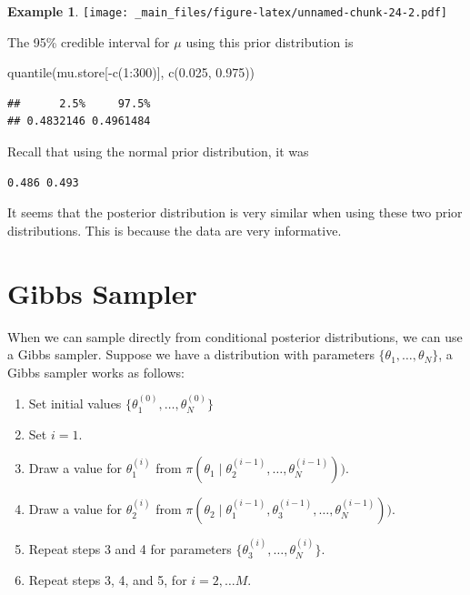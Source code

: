 \documentclass[
]{book}
\newenvironment{Shaded}{\begin{snugshade}}{\end{snugshade}}
\newcommand{\DecValTok}[1]{\textcolor[rgb]{0.00,0.00,0.81}{#1}}
\newcommand{\FloatTok}[1]{\textcolor[rgb]{0.00,0.00,0.81}{#1}}
\newcommand{\FunctionTok}[1]{\textcolor[rgb]{0.00,0.00,0.00}{#1}}
\newcommand{\NormalTok}[1]{#1}
\newcommand{\SpecialCharTok}[1]{\textcolor[rgb]{0.00,0.00,0.00}{#1}}
\theoremstyle{definition}
\theoremstyle{definition}
\newtheorem{example}{Example}[chapter]
\theoremstyle{definition}
\theoremstyle{definition}
\theoremstyle{remark}
\begin{document}
\begin{example}
\texttt{[image: \_main\_files/figure-latex/unnamed-chunk-24-2.pdf]}

The 95\% credible interval for \(\mu\) using this prior distribution is

\begin{Shaded}
\begin{Highlighting}[]
\FunctionTok{quantile}\NormalTok{(mu.store[}\SpecialCharTok{{-}}\FunctionTok{c}\NormalTok{(}\DecValTok{1}\SpecialCharTok{:}\DecValTok{300}\NormalTok{)], }\FunctionTok{c}\NormalTok{(}\FloatTok{0.025}\NormalTok{, }\FloatTok{0.975}\NormalTok{))}
\end{Highlighting}
\end{Shaded}

\begin{verbatim}
##      2.5%     97.5% 
## 0.4832146 0.4961484
\end{verbatim}

Recall that using the normal prior distribution, it was

\begin{verbatim}
0.486 0.493
\end{verbatim}

It seems that the posterior distribution is very similar when using these two prior distributions. This is because the data are very informative.
\end{example}

\hypertarget{gibbs-sampler}{%
\section{Gibbs Sampler}\label{gibbs-sampler}}

When we can sample directly from conditional posterior distributions, we can use a Gibbs sampler. Suppose we have a distribution with parameters \(\{\theta_1, \ldots, \theta_N\}\), a Gibbs sampler works as follows:

\begin{enumerate}
\def\labelenumi{\arabic{enumi}.}
\item
  Set initial values \(\{\theta_1^{(0)}, \ldots, \theta_N^{(0)}\}\)
\item
  Set \(i = 1\).
\item
  Draw a value for \(\theta_1^{(i)}\) from \(\pi(\theta_1 \mid \theta_2^{(i-1)}, \ldots, \theta_N^{(i-1)}))\).
\item
  Draw a value for \(\theta_2^{(i)}\) from \(\pi(\theta_2 \mid \theta_1^{(i-1)}, \theta_3^{(i-1)}, \ldots, \theta_N^{(i-1)}))\).
\item
  Repeat steps 3 and 4 for parameters \(\{\theta_3^{(i)}, \ldots, \theta_N^{(i)}\}\).
\item
  Repeat steps 3, 4, and 5, for \(i = 2, \ldots M\).
\end{enumerate}
\end{document}
